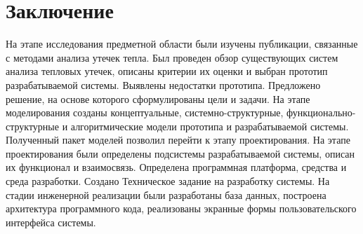 \pagebreak

{
	\titleformat{\section}[block]{\centering\normalfont\large\bfseries}{\thesection}{10pt}{}
	\section*{\centering Заключение}
}

\par
	На этапе исследования предметной области были изучены публикации, связанные с методами анализа утечек тепла. Был проведен обзор существующих систем анализа тепловых утечек, описаны критерии их оценки и выбран прототип разрабатываемой системы. Выявлены недостатки прототипа. Предложено решение, на основе которого сформулированы цели и задачи. На этапе моделирования созданы концептуальные, системно-структурные, функционально-структурные и алгоритмические модели прототипа и разрабатываемой системы. Полученный пакет моделей позволил перейти к этапу проектирования.
	На этапе проектирования были определены подсистемы разрабатываемой системы, описан их функционал и взаимосвязь. Определена программная платформа, средства и среда разработки. Создано Техническое задание на разработку системы. На стадии инженерной реализации были разработаны база данных, построена архитектура программного кода, реализованы экранные формы пользовательского интерфейса системы.
